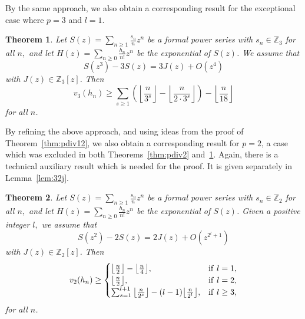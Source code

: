 \documentclass[12pt,reqno]{amsart}
\numberwithin{equation}{section}
\newtheorem{theorem}{Theorem}
\theoremstyle{remark}
\begin{document}
By the same approach, we also obtain a corresponding result for
the exceptional case where $p=3$ and $l=1$.

\begin{theorem} \label{thm:pdiv31}
Let\/ $S(z)=\sum_{n\ge1}\frac {s_n} {n}z^n$ be a formal power series
with $s_n\in{\mathbb{Z}}_3$ for all $n,$ and let 
$H(z)=\sum_{n\ge0}\frac {h_n} {n!}z^n$ be the exponential of $S(z)$.
We assume that
\begin{equation} \label{eq:pS31}
S(z^{3})-3S(z)=3J(z)
+O\left(z^{4}\right) 
\end{equation}
with $J(z)\in {\mathbb{Z}}_3[z]$.
Then
\begin{equation} \label{eq:vpH31}
v_3(h_n)\ge \sum_{s \ge 1}
\left({\left\lfloor{\frac {n} {3^{s}}}\right\rfloor} 
-{\left\lfloor{\frac {n} {2\cdot3^{s}}}\right\rfloor} \right)
-{\left\lfloor{\frac {n} {18}}\right\rfloor} 
\end{equation}
for all $n$.
\end{theorem}

By refining the above approach, and using ideas from the proof of
Theorem~\ref{thm:pdiv12}, we also obtain a corresponding result
for $p=2$, a case which was excluded in both Theorems~\ref{thm:pdiv2}
and~\ref{thm:pdiv31}. Again, there is a technical auxiliary result
which is needed for the proof. It is given separately in
Lemma~\ref{lem:32j}.

\begin{theorem} \label{thm:pdiv22}
Let\/ $S(z)=\sum_{n\ge1}\frac {s_n} {n}z^n$ be a formal power series
with $s_n\in{\mathbb{Z}}_2$ for all $n,$ and let 
$H(z)=\sum_{n\ge0}\frac {h_n} {n!}z^n$ be the exponential of $S(z)$.
Given a positive integer $l,$ we assume that
\begin{equation} \label{eq:pS22}
S(z^{2})-2S(z)=2J(z)
+O\left(z^{2^{l}+1}\right) 
\end{equation}
with $J(z)\in {\mathbb{Z}}_2[z]$.
Then
\begin{equation} \label{eq:vpH22}
v_2(h_n)\ge
\begin{cases} 
{\left\lfloor{\frac {n} {2}}\right\rfloor}
-{\left\lfloor{\frac {n} {4}}\right\rfloor},
&\text{if\/ }l=1,\\
{\left\lfloor{\frac {n} {2}}\right\rfloor},
&\text{if\/ }l=2,\\
\sum_{s=1} ^{l+1}{\left\lfloor{\frac {n} {2^{s}}}\right\rfloor}
-(l-1){\left\lfloor{\frac {n} {2^l}}\right\rfloor},
&\text{if\/ }l\ge3,
\end{cases}
\end{equation}
for all $n$.
\end{theorem}
\end{document}
